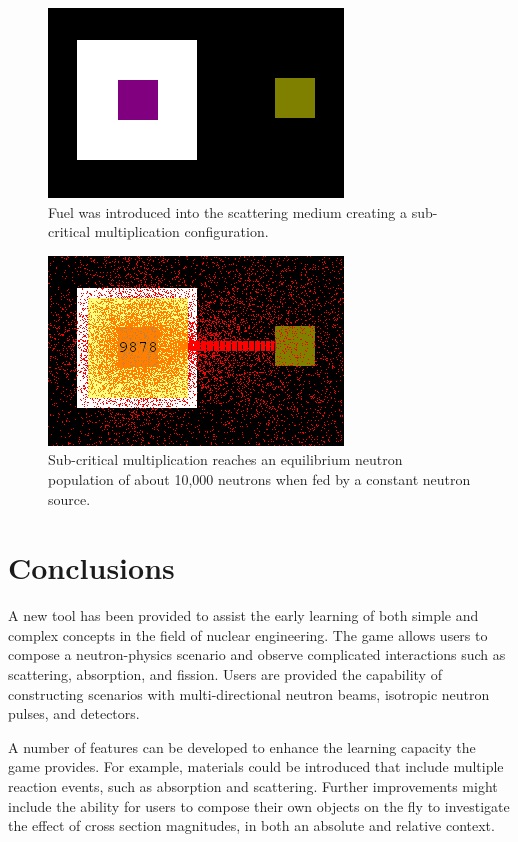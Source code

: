 \documentclass{anstrans}
\begin{document}
\begin{figure}
    \centering
    \includegraphics{subcrit-mult-setup.png}
    \caption{Fuel was introduced into the scattering medium creating a sub-critical multiplication configuration.}
    \label{fig:subcrit-setup}
\end{figure}

\begin{figure}
    \centering
    \includegraphics{subcrit-mult-equil.png}
    \caption{Sub-critical multiplication reaches an equilibrium neutron population of about 10,000 neutrons when fed by a constant neutron source.}
    \label{fig:subcrit-equil}
\end{figure}

\section{Conclusions}

A new tool has been provided to assist the early learning of both simple and
complex concepts in the field of nuclear engineering. The game allows users to
compose a neutron-physics scenario and observe complicated interactions such as
scattering, absorption, and fission. Users are provided the capability of
constructing scenarios with multi-directional neutron beams, isotropic neutron
pulses, and detectors. 

A number of features can be developed to enhance the learning capacity the game
provides. For example, materials could be introduced that include multiple
reaction events, such as absorption and scattering. Further improvements might
include the ability for users to compose their own objects on the fly to
investigate the effect of cross section magnitudes, in both an absolute and
relative context. 
\end{document}
